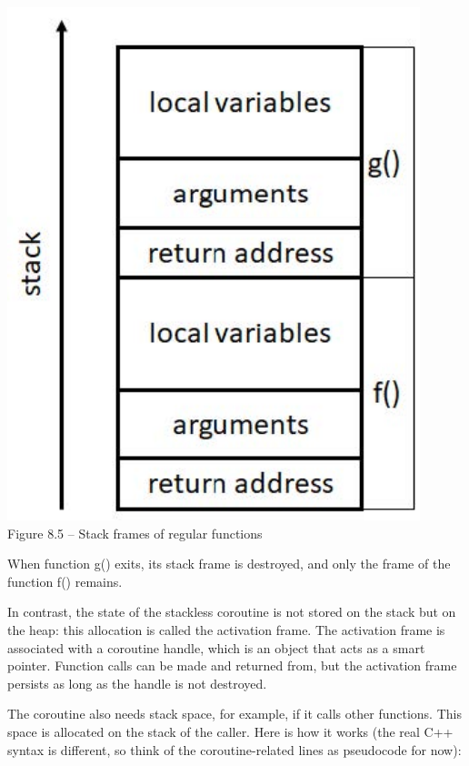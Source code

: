 \hspace*{\fill} \\ %
\begin{center}
\includegraphics[width=0.9\textwidth]{content/2/chapter8/images/5.jpg}\\
Figure 8.5 – Stack frames of regular functions
\end{center}

When function g() exits, its stack frame is destroyed, and only the frame of the function f() remains.

In contrast, the state of the stackless coroutine is not stored on the stack but on the heap: this allocation is called the activation frame. The activation frame is associated with a coroutine handle, which is an object that acts as a smart pointer. Function calls can be made and returned from, but the activation frame persists as long as the handle is not destroyed. 

The coroutine also needs stack space, for example, if it calls other functions. This space is allocated on the stack of the caller. Here is how it works (the real C++ syntax is different, so think of the coroutine-related lines as pseudocode for now):

